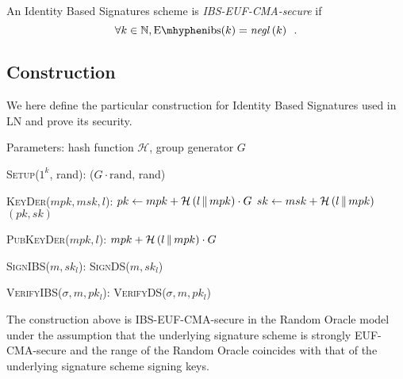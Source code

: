  \begin{definition}
    \label{def:ibs:secure:sup}
    An Identity Based Signatures scheme is \emph{\textsf{IBS-EUF-CMA}-secure}
    if
    \begin{equation*}
      \forall k \in \mathbb{N}, \mathrm{E \mhyphen ibs}(k) =
      \mathit{negl}\left(k\right) \enspace.
    \end{equation*}
  \end{definition}

  \subsection{Construction}
    We here define the particular construction for Identity Based Signatures
    used in LN and prove its security.

    Parameters: hash function $\mathcal{H}$, group generator $G$
    \begin{algorithmic}[0]
      \State \textsc{Setup}($1^k$, rand):
      \Indent
        \State \Return ($G \cdot \mathrm{rand}$, rand)
      \EndIndent
    \end{algorithmic}

    \begin{algorithmic}[0]
      \State \textsc{KeyDer}($mpk, msk, l$):
      \Indent
        \State $pk \gets mpk + \mathcal{H}\left(l \,\|\, mpk\right) \cdot G$
        \State $sk \gets msk + \mathcal{H}\left(l \,\|\, mpk\right)$
        \State \Return $(pk, sk)$
      \EndIndent
    \end{algorithmic}

    \begin{algorithmic}[0]
      \State \textsc{PubKeyDer}($mpk, l$):
      \Indent
        \State \Return $mpk + \mathcal{H}\left(l \,\|\, mpk\right) \cdot G$
      \EndIndent
    \end{algorithmic}

    \begin{algorithmic}[0]
      \State \textsc{SignIBS}($m, sk_l$):
      \Indent
        \State \Return \textsc{SignDS}($m, sk_l$)
      \EndIndent
    \end{algorithmic}

    \begin{algorithmic}[0]
      \State \textsc{VerifyIBS}($\sigma, m, pk_l$):
      \Indent
        \State \Return \textsc{VerifyDS}($\sigma, m, pk_l$)
      \EndIndent
    \end{algorithmic}

    \begin{lemma}
      \label{lemma:ibs}
      The construction above is \textsf{IBS-EUF-CMA}-secure in the Random Oracle
      model under the assumption that the underlying signature scheme is
      strongly \textsf{EUF-CMA}-secure and the range of the Random Oracle
      coincides with that of the underlying signature scheme signing keys.
    \end{lemma}

